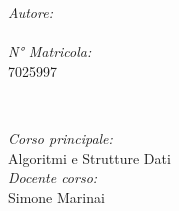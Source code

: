 \begin{titlepage}
\begin{minipage}{0.4\textwidth}
\begin{flushleft} \large
\emph{Autore:}\\
\@author
\\[1.2em]
\emph{N° Matricola:}\\
7025997 \\[1.2em]
\end{flushleft}
\end{minipage}
~
\begin{minipage}{0.4\textwidth}
\begin{flushright} \large
\emph{Corso principale:} \\
Algoritmi e Strutture Dati  \\[1.2em]
\emph{Docente corso:} \\
Simone Marinai
\end{flushright}
\end{minipage}\\[2cm]
\makeatother


\vfill %

\end{titlepage}